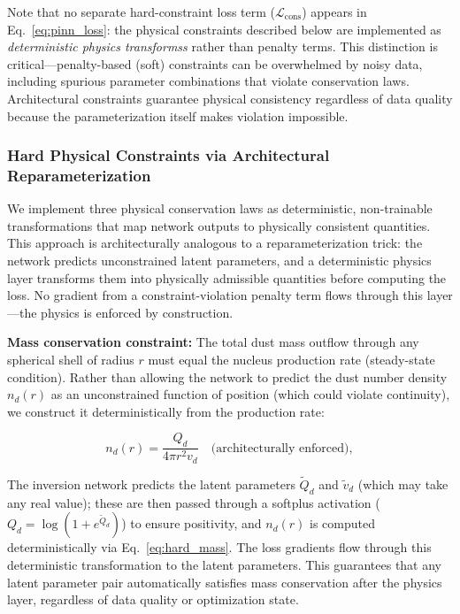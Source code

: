 \documentclass[usenatbib]{mnras}
\begin{document}
Note that no separate hard-constraint loss term ($\mathcal{L}_{\text{cons}}$) appears in Eq.~\ref{eq:pinn_loss}: the physical constraints described below are implemented as \textit{deterministic physics transformss} rather than penalty terms. This distinction is critical---penalty-based (soft) constraints can be overwhelmed by noisy data, including spurious parameter combinations that violate conservation laws. Architectural constraints guarantee physical consistency regardless of data quality because the parameterization itself makes violation impossible.

\subsubsection{Hard Physical Constraints via Architectural Reparameterization}

We implement three physical conservation laws as deterministic, non-trainable transformations that map network outputs to physically consistent quantities. This approach is architecturally analogous to a reparameterization trick: the network predicts unconstrained latent parameters, and a deterministic physics layer transforms them into physically admissible quantities before computing the loss. No gradient from a constraint-violation penalty term flows through this layer---the physics is enforced by construction.

\textbf{Mass conservation constraint:} The total dust mass outflow through any spherical shell of radius $r$ must equal the nucleus production rate (steady-state condition). Rather than allowing the network to predict the dust number density $n_d(r)$ as an unconstrained function of position (which could violate continuity), we construct it deterministically from the production rate:

\begin{equation}\label{eq:hard_mass}
n_d(r) = \frac{Q_d}{4\pi r^2 v_d} \quad \text{(architecturally enforced)},
\end{equation}

The inversion network predicts the latent parameters $\tilde{Q}_d$ and $\tilde{v}_d$ (which may take any real value); these are then passed through a softplus activation ($Q_d = \log(1 + e^{\tilde{Q}_d})$) to ensure positivity, and $n_d(r)$ is computed deterministically via Eq.~\ref{eq:hard_mass}. The loss gradients flow through this deterministic transformation to the latent parameters. This guarantees that any latent parameter pair automatically satisfies mass conservation after the physics layer, regardless of data quality or optimization state.
\end{document}
